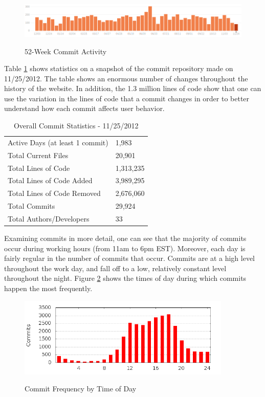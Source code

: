 \documentclass[psamsfonts]{amsart}
\begin{document}
\begin{figure}[h!]
\caption{52-Week Commit Activity}
\includegraphics[width=5in]{pictures/commit-activity.png}
\label{fig:commit-history}
\end{figure}

Table \ref{table:commit-stats} shows statistics on a snapshot of the commit repository made on 11/25/2012. The table shows an enormous number of changes throughout the history of the website. In addition, the 1.3 million lines of code show that one can use the variation in the lines of code that a commit changes in order to better understand how each commit affects user behavior.

\begin{table}[h!]
\centering
\caption{Overall Commit Statistics - 11/25/2012}
\begin{tabular}{l || l }
\hline
Active Days (at least 1 commit) & 1,983 \\
Total Current Files & 20,901 \\
Total Lines of Code & 1,313,235 \\
Total Lines of Code Added & 3,989,295 \\
Total Lines of Code Removed & 2,676,060 \\
Total Commits & 29,924 \\
Total Authors/Developers & 33 \\
\hline
\end{tabular}
\label{table:commit-stats}
\end{table}

Examining commits in more detail, one can see that the majority of commits occur during working hours (from 11am to 6pm EST). Moreover, each day is fairly regular in the number of commits that occur. Commits are at a high level throughout the work day, and fall off to a low, relatively constant level throughout the night. Figure \ref{fig:commit-hours} shows the times of day during which commits happen the most frequently. 

\begin{figure}[h!]
\centering
\caption{Commit Frequency by Time of Day}
\includegraphics[width=4in]{pictures/commit-hours.png}
\label{fig:commit-hours}
\end{figure}
\end{document}

